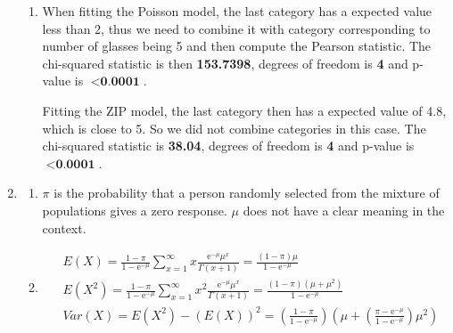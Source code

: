 \documentclass{article}
\begin{document}
\begin{enumerate}[leftmargin = 0 em, label = \arabic*., font = \bfseries]
\begin{enumerate}
		    \item 
		    When fitting the Poisson model, the last category has a expected value less than 2, thus we need to combine it with category corresponding to number of glasses being 5 and then compute the Pearson statistic. The chi-squared statistic is then \textbf{153.7398}, degrees of freedom is \textbf{4} and p-value is $< \textbf{0.0001}$. 

		    Fitting the ZIP model, the last category then has a expected value of 4.8, which is close to 5. So we did not combine categories in this case. The chi-squared statistic is \textbf{38.04},  degrees of freedom is \textbf{4} and p-value is $< \textbf{0.0001}$. 


		     
		   
		    

		   
	\end{enumerate}

	\item 
	\begin{enumerate}
		\item 
		$\pi$ is the probability that a person randomly selected from the mixture of populations gives a zero response. $\mu$ does not have a clear meaning in the context.
		\item 
		\begin{align*}
		& E(X) = \frac{1 - \pi}{1 - \mathrm{e}^{-\mu}} \sum_{x = 1}^\infty x\frac{\mathrm{e}^{-\mu} \mu^x}{\Gamma(x+1)} = \frac{(1 - \pi)\mu}{1 - \mathrm{e}^{- \mu}}\\
		& E(X^2) = \frac{1 - \pi}{1 - \mathrm{e}^{-\mu}} \sum_{x = 1}^\infty x^2\frac{\mathrm{e}^{-\mu} \mu^x}{\Gamma(x+1)} = \frac{(1 - \pi)(\mu + \mu^2)}{1 - \mathrm{e}^{- \mu}}\\
		& Var(X) = E(X^2) - (E(X))^2 = \left(\frac{1 - \pi}{1 - \mathrm{e}^{-\mu}}\right)\left(\mu + \left(\frac{\pi - \mathrm{e}^{-\mu}}{1 - \mathrm{e}^{-\mu}}\right)\mu^2\right)
		\end{align*}


\end{enumerate}
\end{enumerate}
\end{document}
